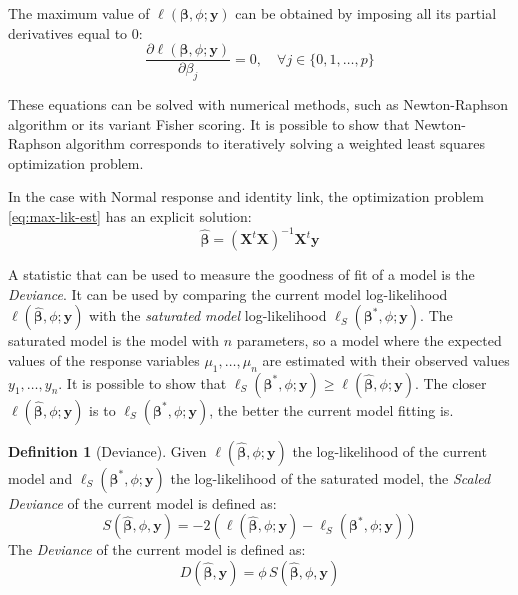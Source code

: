 \documentclass[a4paper, twoside, openright, 12pt]{report}
\theoremstyle{definition}
\newtheorem{definition}{Definition}[chapter]
\theoremstyle{definition}
\theoremstyle{definition}
\theoremstyle{remark}
\begin{document}
The maximum value of \(\ell\left(\boldsymbol{\beta}, \phi; \boldsymbol{y}\right)\) can be obtained by imposing all its partial derivatives equal to \(0\):
\[
\frac{\partial \ell\left(\boldsymbol{\beta}, \phi; \boldsymbol{y}\right)}
{\partial\beta_j}
= 0, \quad \forall j\in\{0,1,\dots,p\}
\]

These equations can be solved with numerical methods, such as Newton-Raphson algorithm or its variant Fisher scoring. It is possible to show that Newton-Raphson algorithm corresponds to iteratively solving a weighted least squares optimization problem.

In the case with Normal response and identity link, the optimization problem \eqref{eq:max-lik-est} has an explicit solution:
\[
\hat{\boldsymbol{\beta}} = \left( \boldsymbol{X}^t \boldsymbol{X} \right)^{-1} \boldsymbol{X}^t \boldsymbol{y}
\]

A statistic that can be used to measure the goodness of fit of a model is the \emph{Deviance}. It can be used by comparing the current model log-likelihood \(\ell\left(\hat{\boldsymbol{\beta}}, \phi; \boldsymbol{y}\right)\) with the \emph{saturated model} log-likelihood \(\ell_{S}\left(\boldsymbol{\beta}^*, \phi; \boldsymbol{y}\right)\). The saturated model is the model with \(n\) parameters, so a model where the expected values of the response variables \(\mu_1, \dots, \mu_n\) are estimated with their observed values \(y_1, \dots, y_n\). It is possible to show that \(\ell_{S}\left(\boldsymbol{\beta}^*, \phi; \boldsymbol{y}\right) \ge \ell\left(\hat{\boldsymbol{\beta}}, \phi; \boldsymbol{y}\right)\). The closer \(\ell\left(\hat{\boldsymbol{\beta}}, \phi; \boldsymbol{y}\right)\) is to \(\ell_{S}\left(\boldsymbol{\beta}^*, \phi; \boldsymbol{y}\right)\), the better the current model fitting is.

\begin{definition}[Deviance]
\label{def:deviance-def} \iffalse (Deviance) \fi{} Given \(\ell\left(\hat{\boldsymbol{\beta}}, \phi; \boldsymbol{y}\right)\) the log-likelihood of the current model and \(\ell_{S}\left(\boldsymbol{\beta}^*, \phi; \boldsymbol{y}\right)\) the log-likelihood of the saturated model, the \textit{Scaled Deviance} of the current model is defined as:
\[
S(\hat{\boldsymbol{\beta}}, \phi, \boldsymbol{y}) =
-2\left(
\ell\left(\hat{\boldsymbol{\beta}}, \phi; \boldsymbol{y}\right)
- \ell_{S}\left(\boldsymbol{\beta}^*, \phi; \boldsymbol{y}\right)
\right)
\]
The \textit{Deviance} of the current model is defined as:
\[
D(\hat{\boldsymbol{\beta}}, \boldsymbol{y}) =
\phi \, S(\hat{\boldsymbol{\beta}}, \phi, \boldsymbol{y})
\]
\end{definition}
\end{document}
